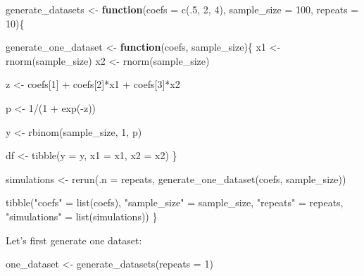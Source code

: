 \documentclass[
]{article}
\newenvironment{Shaded}{\begin{snugshade}}{\end{snugshade}}
\newcommand{\AttributeTok}[1]{\textcolor[rgb]{0.77,0.63,0.00}{#1}}
\newcommand{\ControlFlowTok}[1]{\textcolor[rgb]{0.13,0.29,0.53}{\textbf{#1}}}
\newcommand{\DecValTok}[1]{\textcolor[rgb]{0.00,0.00,0.81}{#1}}
\newcommand{\FunctionTok}[1]{\textcolor[rgb]{0.00,0.00,0.00}{#1}}
\newcommand{\NormalTok}[1]{#1}
\newcommand{\OtherTok}[1]{\textcolor[rgb]{0.56,0.35,0.01}{#1}}
\newcommand{\SpecialCharTok}[1]{\textcolor[rgb]{0.00,0.00,0.00}{#1}}
\newcommand{\StringTok}[1]{\textcolor[rgb]{0.31,0.60,0.02}{#1}}
\begin{document}
\begin{Shaded}
\begin{Highlighting}[]
\NormalTok{generate\_datasets }\OtherTok{\textless{}{-}} \ControlFlowTok{function}\NormalTok{(}\AttributeTok{coefs =} \FunctionTok{c}\NormalTok{(.}\DecValTok{5}\NormalTok{, }\DecValTok{2}\NormalTok{, }\DecValTok{4}\NormalTok{), }\AttributeTok{sample\_size =} \DecValTok{100}\NormalTok{, }\AttributeTok{repeats =} \DecValTok{10}\NormalTok{)\{}

\NormalTok{  generate\_one\_dataset }\OtherTok{\textless{}{-}} \ControlFlowTok{function}\NormalTok{(coefs, sample\_size)\{}
\NormalTok{  x1 }\OtherTok{\textless{}{-}} \FunctionTok{rnorm}\NormalTok{(sample\_size)}
\NormalTok{  x2 }\OtherTok{\textless{}{-}} \FunctionTok{rnorm}\NormalTok{(sample\_size)}
  
\NormalTok{  z }\OtherTok{\textless{}{-}}\NormalTok{ coefs[}\DecValTok{1}\NormalTok{] }\SpecialCharTok{+}\NormalTok{ coefs[}\DecValTok{2}\NormalTok{]}\SpecialCharTok{*}\NormalTok{x1 }\SpecialCharTok{+}\NormalTok{ coefs[}\DecValTok{3}\NormalTok{]}\SpecialCharTok{*}\NormalTok{x2}

\NormalTok{  p }\OtherTok{\textless{}{-}} \DecValTok{1}\SpecialCharTok{/}\NormalTok{(}\DecValTok{1} \SpecialCharTok{+} \FunctionTok{exp}\NormalTok{(}\SpecialCharTok{{-}}\NormalTok{z))}

\NormalTok{  y }\OtherTok{\textless{}{-}} \FunctionTok{rbinom}\NormalTok{(sample\_size, }\DecValTok{1}\NormalTok{, p)}

\NormalTok{  df }\OtherTok{\textless{}{-}} \FunctionTok{tibble}\NormalTok{(}\AttributeTok{y =}\NormalTok{ y, }\AttributeTok{x1 =}\NormalTok{ x1, }\AttributeTok{x2 =}\NormalTok{ x2)}
\NormalTok{  \}}

\NormalTok{  simulations }\OtherTok{\textless{}{-}} \FunctionTok{rerun}\NormalTok{(}\AttributeTok{.n =}\NormalTok{ repeats, }\FunctionTok{generate\_one\_dataset}\NormalTok{(coefs, sample\_size))}
 
  \FunctionTok{tibble}\NormalTok{(}\StringTok{"coefs"} \OtherTok{=} \FunctionTok{list}\NormalTok{(coefs), }\StringTok{"sample\_size"} \OtherTok{=}\NormalTok{ sample\_size, }\StringTok{"repeats"} \OtherTok{=}\NormalTok{ repeats, }\StringTok{"simulations"} \OtherTok{=} \FunctionTok{list}\NormalTok{(simulations))}
\NormalTok{\}}
\end{Highlighting}
\end{Shaded}

Let's first generate one dataset:

\begin{Shaded}
\begin{Highlighting}[]
\NormalTok{one\_dataset }\OtherTok{\textless{}{-}} \FunctionTok{generate\_datasets}\NormalTok{(}\AttributeTok{repeats =} \DecValTok{1}\NormalTok{)}
\end{Highlighting}
\end{Shaded}
\end{document}
